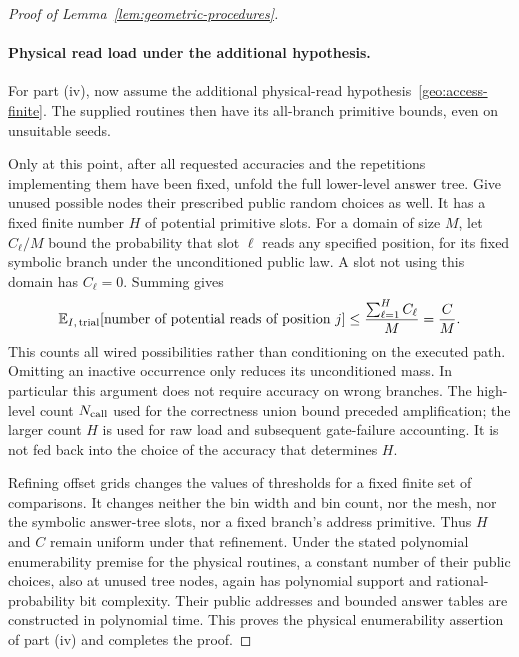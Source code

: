 \begin{proof}[Proof of Lemma~\ref{lem:geometric-procedures}]
\paragraph{Physical read load under the additional hypothesis.}
For part (iv), now assume the additional physical-read
hypothesis~\ref{geo:access-finite}. The supplied routines then have
its all-branch primitive bounds, even on unsuitable seeds.

Only at this point, after all requested accuracies and the repetitions
implementing them have been fixed, unfold the full lower-level answer
tree. Give unused possible nodes their prescribed public random choices
as well. It has a fixed finite number $H$ of potential primitive slots.
For a domain of size $M$, let $C_\ell/M$ bound the probability that
slot $\ell$ reads any specified position, for its fixed symbolic branch
under the unconditioned public law. A slot not using this domain has
$C_\ell=0$. Summing gives
\begin{equation}\label{geo:raw-load}
 \mathbb{E}_{I,\,\mathrm{trial}}
       [\text{number of potential reads of position }j]
 \le\frac{\sum_{\ell=1}^H C_\ell}{M}
 =\frac C M.
\end{equation}
This counts all wired possibilities rather than conditioning on the
executed path. Omitting an inactive occurrence only reduces its
unconditioned mass. In particular this argument does not require
accuracy on wrong branches. The high-level count $N_{\rm call}$ used for the
correctness union bound preceded amplification; the larger count $H$
is used for raw load and subsequent gate-failure accounting. It is
not fed back into the choice of the accuracy that determines $H$.

Refining offset grids changes the values of thresholds for a fixed
finite set of comparisons. It changes neither the bin width and bin
count, nor the mesh, nor the symbolic answer-tree slots, nor a
fixed branch's address primitive. Thus $H$ and $C$ remain uniform
under that refinement. Under the stated polynomial enumerability
premise for the physical routines, a constant number of their public
choices, also at unused tree nodes, again has polynomial support and
rational-probability bit complexity. Their public addresses and bounded
answer tables are constructed in polynomial time. This proves the
physical enumerability assertion of part (iv) and completes the proof.
\end{proof}

